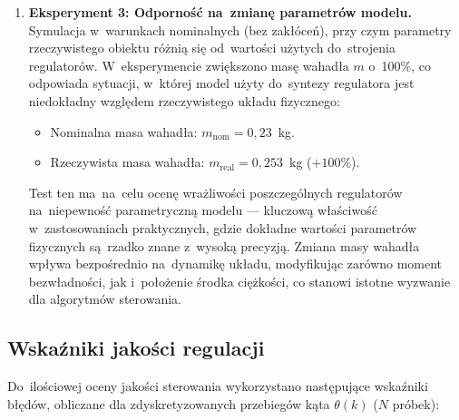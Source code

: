 \begin{enumerate}
    \item \textbf{Eksperyment 3: Odporność na~zmianę parametrów modelu.} \\
    Symulacja w~warunkach nominalnych (bez zakłóceń), przy czym parametry
    rzeczywistego obiektu różnią się od~wartości użytych do~strojenia regulatorów.
    W~eksperymencie zwiększono masę wahadła $m$ o~100\%, co odpowiada sytuacji,
    w~której model użyty do~syntezy regulatora jest niedokładny względem
    rzeczywistego układu fizycznego:
    \begin{itemize}
        \item Nominalna masa wahadła: $m_{\mathrm{nom}} = 0{,}23$~kg.
        \item Rzeczywista masa wahadła: $m_{\mathrm{real}} = 0{,}253$~kg ($+100\%$).
    \end{itemize}
    Test ten ma~na~celu ocenę wrażliwości poszczególnych regulatorów na~niepewność
    parametryczną modelu --- kluczową właściwość w~zastosowaniach praktycznych,
    gdzie dokładne wartości parametrów fizycznych są~rzadko znane z~wysoką precyzją.
    Zmiana masy wahadła wpływa bezpośrednio na~dynamikę układu, modyfikując zarówno
    moment bezwładności, jak i~położenie środka ciężkości, co stanowi istotne
    wyzwanie dla algorytmów sterowania.
\end{enumerate}

\subsection{Wskaźniki jakości regulacji}

Do~ilościowej oceny jakości sterowania wykorzystano następujące wskaźniki
błędów, obliczane dla zdyskretyzowanych przebiegów kąta $\theta(k)$
($N$ próbek):

